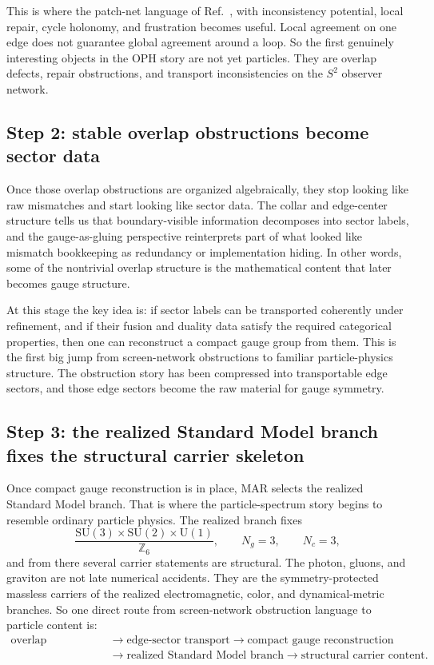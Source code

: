 \documentclass[11pt]{article}
\newcommand{\SU}{\mathrm{SU}}
\newcommand{\U}{\mathrm{U}}
\begin{document}
This is where the patch-net language of Ref.~\cite{ophconsensus}, with inconsistency potential, local repair, cycle
holonomy, and frustration becomes useful. Local agreement on one edge does not guarantee global
agreement around a loop. So the first genuinely interesting objects in the OPH story are not yet
particles. They are overlap defects, repair obstructions, and transport inconsistencies on the
\(S^2\) observer network.

\subsection{Step 2: stable overlap obstructions become sector data}

Once those overlap obstructions are organized algebraically, they stop looking like raw
mismatches and start looking like sector data. The collar and edge-center structure tells us that
boundary-visible information decomposes into sector labels, and the gauge-as-gluing perspective
reinterprets part of what looked like mismatch bookkeeping as redundancy or implementation
hiding. In other words, some of the nontrivial overlap structure is the
mathematical content that later becomes gauge structure.

At this stage the key idea is: if sector labels can be transported coherently under refinement,
and if their fusion and duality data satisfy the required categorical properties, then one can
reconstruct a compact gauge group from them. This is the first big jump from screen-network
obstructions to familiar particle-physics structure. The obstruction story has been compressed
into transportable edge sectors, and those edge sectors become the raw material for gauge
symmetry.

\subsection{Step 3: the realized Standard Model branch fixes the structural carrier skeleton}

Once compact gauge reconstruction is in place, MAR selects the realized Standard Model branch.
That is where the particle-spectrum story begins to resemble ordinary particle physics. The
realized branch fixes
\[
\frac{\SU(3)\times\SU(2)\times\U(1)}{\mathbb Z_6},
\qquad
N_g=3,
\qquad
N_c=3,
\]
and from there several carrier statements are structural. The photon, gluons, and
graviton are not late numerical accidents. They are the symmetry-protected massless carriers of
the realized electromagnetic, color, and dynamical-metric branches. So one direct route from
screen-network obstruction language to particle content is:
\[
\begin{aligned}
\text{overlap obstruction}
&\to \text{edge-sector transport}
\to \text{compact gauge reconstruction} \\
&\to \text{realized Standard Model branch}
\to \text{structural carrier content}.
\end{aligned}
\]
\end{document}
